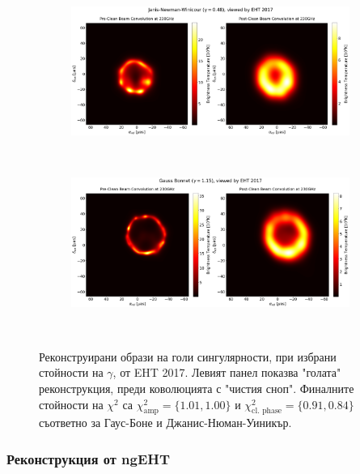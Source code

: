 \documentclass[12pt]{article}
\numberwithin{equation}{section}
\numberwithin{figure}{section}
\begin{document}
	\newpage
	\begin{figure}[h!]
		\centering
		\begin{subfigure}{12cm}
			\hspace{-1.5cm}
			\includegraphics[scale = 0.23]{Section_8_Observing_Horizonless_Objects/Ehtim_plot_2017_no_blur_JNW.png}
		\end{subfigure}\\
		\begin{subfigure}{12cm}
			\hspace{-1.5cm}
			\includegraphics[scale = 0.23]{Section_8_Observing_Horizonless_Objects/Ehtim_plot_2017_no_blur_GB.png}
		\end{subfigure}\\
		\label{Naked_Singularity_EHT_2017}
		\caption[Реконструирани образи на голи сингулярности, при избрани стойности на $\gamma$, от EHT 2017]{\small Реконструирани образи на голи сингулярности, при избрани стойности на $\gamma$, от EHT 2017. Левият панел показва "голата"$\,$ реконструкция, преди коволюцията с "чистия сноп". Финалните стойности на $\chi^2$ са $\chi^2_\text{amp} = \{1.01, 1.00\}$ и $\chi^2_\text{cl. phase} = \{0.91, 0.84\}$ съответно за Гаус-Боне и Джанис-Нюман-Уиникър.} 
	\end{figure}
	
	\subsubsection{Реконструкция от ngEHT}
	
\end{document}
